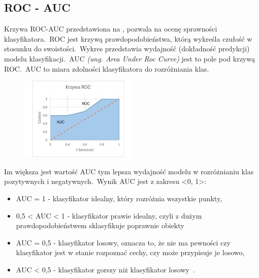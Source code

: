 \subsection{ROC - AUC}
Krzywa ROC-AUC przedstawiona na , pozwala na ocenę sprawności klasyfikatora.\ ROC jest krzywą prawdopodobieństwa, którą wykreśla czułość w stosunku do swoistości.\ Wykres przedstawia wydajność (dokładność predykcji) modelu klasyfikacji.\ AUC \textit{(ang. Area Under Roc Curve)} jest to pole pod krzywą ROC.\ AUC to miara zdolności klasyfikatora do rozróżniania klas.

\begin{figure}[H]
    \centering
    \includegraphics[width=0.5\textwidth]{images/roc-auc}
    \label{fig:roc-auc}
\end{figure}

Im większa jest wartość AUC tym lepsza wydajność modelu w rozróżnianiu klas pozytywnych i negatywnych.\ Wynik AUC jest z zakresu <0, 1>:
\begin{itemize}
    \item AUC = 1 - klasyfikator idealny, który rozróżnia wszystkie punkty,
    \item 0,5 < AUC < 1 - klasyfikator prawie idealny, czyli z dużym prawdopodobieństwem sklasyfikuje poprawnie obiekty
    \item AUC = 0,5 - klasyfikator losowy, oznacza to, że nie ma pewności czy klasyfikator jest w stanie rozpoznać cechy, czy może przypisuje je losowo,
    \item AUC < 0,5 - klasyfikator gorszy niż klasyfikator losowy~\cite{Algolytics, Agrawal2024}.
\end{itemize}